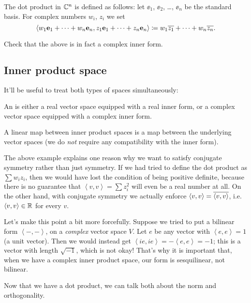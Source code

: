 \begin{example}
	[$\CC^n$]
	The dot product in $\CC^n$ is defined as follows:
	let $\ee_1$, $\ee_2$, \dots, $\ee_n$ be the standard basis.
	For complex numbers $w_i$, $z_i$ we set
	\[
		\left< w_1 \mathbf e_1 + \dots + w_n \mathbf e_n, z_1 \mathbf e_1 + \dots + z_n \mathbf e_n \right>
		\coloneqq w_1\overline{z_1} + \dots + w_n \overline{z_n}.
	\]
\end{example}
\begin{ques}
	Check that the above is in fact a complex inner form.
\end{ques}

\subsection{Inner product space}
It'll be useful to treat both types of spaces simultaneously:
\begin{definition}
	An  is either a real vector space
	equipped with a real inner form,
	or a complex vector space equipped with a complex inner form.

	A linear map between inner product spaces
	is a map between the underlying vector spaces
	(we do \emph{not} require any compatibility with the inner form).
\end{definition}

\begin{remark}
	The above example explains one reason why we want
	to satisfy conjugate symmetry rather than just symmetry.
	If we had tried to define the dot product as $\sum w_i z_i$,
	then we would have lost the condition of being positive definite,
	because there is no guarantee that
	$\left< v,v \right> = \sum z_i^2$ will even be a real number at all.
	On the other hand, with conjugate symmetry
	we actually enforce $\left< v,v \right> = \overline{\left< v,v \right>}$,
	i.e.\ $\left< v,v \right> \in \mathbb R$ for every $v$.

	Let's make this point a bit more forcefully.
	Suppose we tried to put a bilinear form $\left< -, -\right>$,
	on a \emph{complex} vector space $V$.
	Let $e$ be any vector with $\left< e, e \right> = 1$ (a unit vector).
	Then we would instead get
	$\left< ie, ie \right> = - \left< e,e \right> = -1$;
	this is a vector with length $\sqrt{-1}$, which is not okay!
	That's why it is important that,
	when we have a complex inner product space,
	our form is sesquilinear, not bilinear.
\end{remark}

Now that we have a dot product,
we can talk both about the norm and orthogonality.

